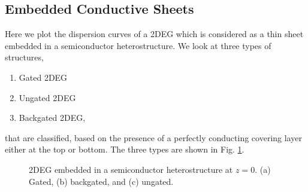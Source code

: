 \subsection{Embedded Conductive Sheets}
%
%
Here we plot the dispersion curves of a 2DEG which is considered as a thin sheet embedded in a semiconductor heterostructure. We look at three types of structures,
%
\begin{enumerate}
  \item Gated 2DEG
  \item Ungated 2DEG
  \item Backgated 2DEG,
\end{enumerate}
%
that are classified, based on the presence of a perfectly conducting covering layer either at the top or bottom. The three types are shown in Fig. \ref{fig:2deg_structure_types}.
%
\begin{figure}[!htbp]
   \hfil
   \hfil
   \hfil
  \caption{2DEG embedded in a semiconductor heterostructure at $z=0$. (a) Gated, (b) backgated, and (c) ungated.}
  \label{fig:2deg_structure_types}
\end{figure}
%

